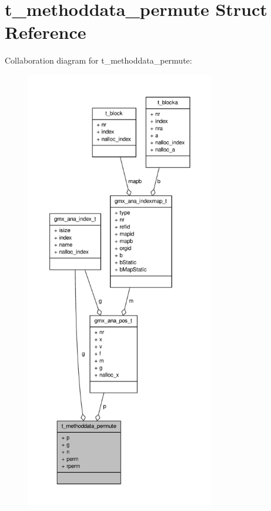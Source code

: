 \hypertarget{structt__methoddata__permute}{\section{t\-\_\-methoddata\-\_\-permute \-Struct \-Reference}
\label{structt__methoddata__permute}
}


\-Collaboration diagram for t\-\_\-methoddata\-\_\-permute\-:
\nopagebreak
\begin{figure}[H]
\begin{center}
\leavevmode
\includegraphics[height=550pt]{structt__methoddata__permute__coll__graph}
\end{center}
\end{figure}
